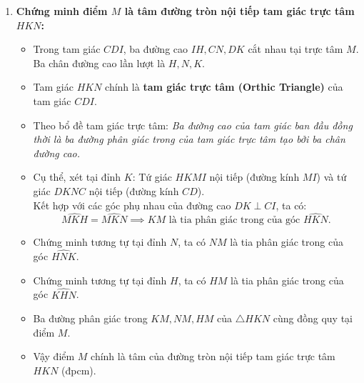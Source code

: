 \begin{ex}
{\begin{enumerate}[label=\textbf{\alph*)}]
    \item \textbf{Chứng minh điểm $M$ là tâm đường tròn nội tiếp tam giác trực tâm $HKN$:}
    \begin{itemize}
        \item Trong tam giác $CDI$, ba đường cao $IH, CN, DK$ cắt nhau tại trực tâm $M$. Ba chân đường cao lần lượt là $H, N, K$.
        \item Tam giác $HKN$ chính là \textbf{tam giác trực tâm (Orthic Triangle)} của tam giác $CDI$.
        \item Theo bổ đề tam giác trực tâm: \textit{Ba đường cao của tam giác ban đầu đồng thời là ba đường phân giác trong của tam giác trực tâm tạo bởi ba chân đường cao.}
        \item Cụ thể, xét tại đỉnh $K$:
        Tứ giác $HKMI$ nội tiếp (đường kính $MI$) và tứ giác $DKNC$ nội tiếp (đường kính $CD$).\\
        Kết hợp với các góc phụ nhau của đường cao $DK \perp CI$, ta có:
        \[
        \widehat{MKH} = \widehat{MKN} \implies KM \text{ là tia phân giác trong của góc } \widehat{HKN}.
        \]
        \item Chứng minh tương tự tại đỉnh $N$, ta có $NM$ là tia phân giác trong của góc $\widehat{HNK}$.
        \item Chứng minh tương tự tại đỉnh $H$, ta có $HM$ là tia phân giác trong của góc $\widehat{KHN}$.
        \item Ba đường phân giác trong $KM, NM, HM$ của $\triangle HKN$ cùng đồng quy tại điểm $M$.
        \item Vậy điểm $M$ chính là tâm của đường tròn nội tiếp tam giác trực tâm $HKN$ (đpcm).
    \end{itemize}
\end{enumerate}
}
\end{ex}
